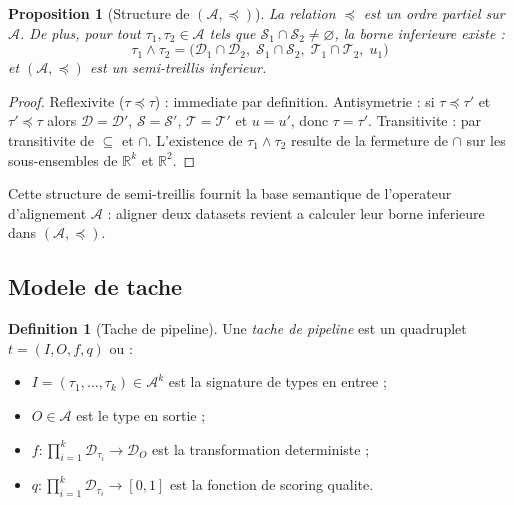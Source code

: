 \documentclass[12pt,a4paper]{article}
\theoremstyle{plain}
\newtheorem{proposition}[theorem]{Proposition}
\theoremstyle{definition}
\newtheorem{definition}[theorem]{Definition}
\theoremstyle{remark}
\newcommand{\R}{\mathbb{R}}
\begin{document}
\begin{proposition}[Structure de $(\mathcal{A}, \preceq)$]
\label{prop:lattice}
La relation $\preceq$ est un ordre partiel sur $\mathcal{A}$.
De plus, pour tout $\tau_1, \tau_2 \in \mathcal{A}$ tels que
$\mathcal{S}_1 \cap \mathcal{S}_2 \neq \varnothing$, la borne inferieure
existe :
\[
\tau_1 \wedge \tau_2 = \bigl(\mathcal{D}_1 \cap \mathcal{D}_2,\;
  \mathcal{S}_1 \cap \mathcal{S}_2,\;
  \mathcal{T}_1 \cap \mathcal{T}_2,\;
  u_1\bigr)
\]
et $(\mathcal{A}, \preceq)$ est un semi-treillis inferieur.
\end{proposition}

\begin{proof}
Reflexivite ($\tau \preceq \tau$) : immediate par definition.
Antisymetrie : si $\tau \preceq \tau'$ et $\tau' \preceq \tau$ alors
$\mathcal{D} = \mathcal{D}'$, $\mathcal{S} = \mathcal{S}'$,
$\mathcal{T} = \mathcal{T}'$ et $u=u'$, donc $\tau = \tau'$.
Transitivite : par transitivite de $\subseteq$ et $\cap$.
L'existence de $\tau_1 \wedge \tau_2$ resulte de la fermeture de
$\cap$ sur les sous-ensembles de $\R^k$ et $\R^2$.
\end{proof}

Cette structure de semi-treillis fournit la base semantique de l'operateur
d'alignement $\mathcal{A}$ : aligner deux datasets revient a calculer
leur borne inferieure dans $(\mathcal{A},\preceq)$.

\subsection{Modele de tache}
\label{subsec:task}

\begin{definition}[Tache de pipeline]
\label{def:task}
Une \emph{tache de pipeline} est un quadruplet $t = (I, O, f, q)$ ou :
\begin{itemize}[noitemsep]
  \item $I = (\tau_1,\ldots,\tau_k) \in \mathcal{A}^k$ est la signature
    de types en entree ;
  \item $O \in \mathcal{A}$ est le type en sortie ;
  \item $f : \prod_{i=1}^k \mathcal{D}_{\tau_i} \to \mathcal{D}_O$ est
    la transformation deterministe ;
  \item $q : \prod_{i=1}^k \mathcal{D}_{\tau_i} \to [0,1]$ est la
    fonction de scoring qualite.
\end{itemize}
\end{definition}
\end{document}
